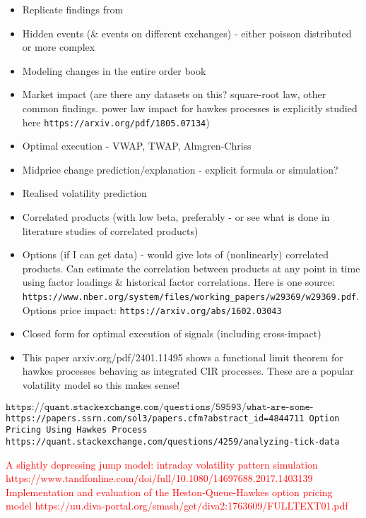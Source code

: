 \documentclass[honours,12pt]{unswthesis}
\numberwithin{equation}{section}
\begin{document}
\begin{itemize}
	\item Replicate findings from \cite{MorariuPatrichiPakkanen}
	\item Hidden events (\& events on different exchanges) - either poisson distributed or more complex
	\item Modeling changes in the entire order book
	\item Market impact (are there any datasets on this? square-root law, other common findings. power law impact for hawkes processes is explicitly studied here \texttt{https://arxiv.org/pdf/1805.07134})
	\item Optimal execution - VWAP, TWAP, Almgren-Chriss
	\item Midprice change prediction/explanation - explicit formula or simulation?
	\item Realised volatility prediction
	\item Correlated products (with low beta, preferably - or see what is done in literature studies of correlated products)
	\item Options (if I can get data) - would give lots of (nonlinearly) correlated products. Can estimate the correlation between products at any point in time using factor loadings \& historical factor correlations. Here is one source: \texttt{https://www.nber.org/system/files/working_papers/w29369/w29369.pdf}. Options price impact: \texttt{https://arxiv.org/abs/1602.03043}
	\item Closed form for optimal execution of signals (including cross-impact)
	\item This paper arxiv.org/pdf/2401.11495 shows a functional limit theorem for hawkes processes behaving as integrated CIR processes. These are a popular volatility model so this makes sense!
\end{itemize}

$\texttt{https://quant.stackexchange.com/questions/59593/what-are-some-currently-open-problems-in-market-microstructure}$
\texttt{https://papers.ssrn.com/sol3/papers.cfm?abstract_id=4844711 Option Pricing Using Hawkes Process}
\texttt{https://quant.stackexchange.com/questions/4259/analyzing-tick-data}

\textcolor{red}{A slightly depressing jump model: intraday volatility pattern simulation https://www.tandfonline.com/doi/full/10.1080/14697688.2017.1403139}
\textcolor{red}{Implementation and evaluation of the Heston-Queue-Hawkes option pricing model https://uu.diva-portal.org/smash/get/diva2:1763609/FULLTEXT01.pdf}
\end{document}
